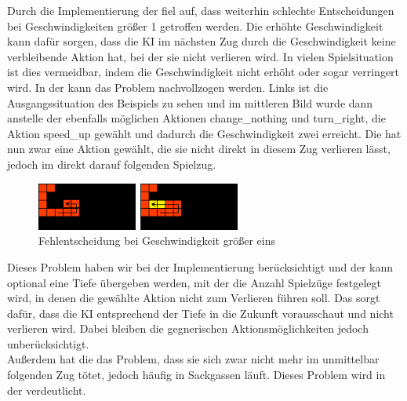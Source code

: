 Durch die Implementierung der  fiel auf, dass weiterhin schlechte Entscheidungen bei
Geschwindigkeiten größer 1 getroffen werden.
Die erhöhte Geschwindigkeit kann dafür sorgen, dass die \ac{KI} im nächsten Zug durch die Geschwindigkeit keine
verbleibende Aktion hat, bei der sie nicht verlieren wird.
In vielen Spielsituation ist dies vermeidbar, indem die Geschwindigkeit nicht erhöht oder sogar verringert wird.
In der  kann das Problem nachvollzogen werden.
Links ist die Ausgangssituation des Beispiels zu sehen und im mittleren Bild wurde dann anstelle der ebenfalls möglichen
Aktionen change\_nothing und turn\_right, die Aktion speed\_up gewählt und dadurch die Geschwindigkeit zwei erreicht.
Die  hat nun zwar eine Aktion gewählt, die sie nicht direkt in diesem Zug verlieren lässt,
jedoch im direkt darauf folgenden Spielzug.

\begin{figure}[htb]
    \centering
    \includegraphics[width=0.6\textwidth]{Bilder/geschwindigkeit_problem.png}
    \caption{ Fehlentscheidung bei Geschwindigkeit größer eins}
    \label{fig:Geschwindigkeit-Problem}
\end{figure}

Dieses Problem haben wir bei der Implementierung berücksichtigt und der  kann optional eine
Tiefe übergeben werden, mit der die Anzahl Spielzüge festgelegt wird, in denen die gewählte Aktion nicht zum Verlieren
führen soll.
Das sorgt dafür, dass die \ac{KI} entsprechend der Tiefe in die Zukunft vorausschaut und nicht verlieren wird.
Dabei bleiben die gegnerischen Aktionsmöglichkeiten jedoch unberücksichtigt. \\

Außerdem hat die  das Problem, dass sie sich zwar nicht mehr im unmittelbar folgenden Zug
tötet, jedoch häufig in Sackgassen läuft.
Dieses Problem wird in der  verdeutlicht.

